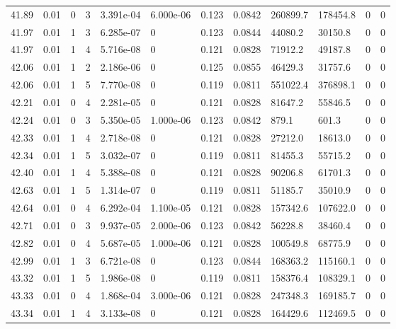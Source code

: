\documentclass[preview]{standalone}
\begin{document}
{{{{{{{{{{{{\begin{tabular}{L{1.2cm}C{1.2cm} C{0.3cm}C{0.5cm} C{1.4cm}C{1.4cm} C{1.4cm}C{1.4cm} C{1.6cm}C{1.6cm} C{1.6cm}C{1.6cm}}
  41.89  &  0.01  & 0     &  3 &  3.391e-04  & 6.000e-06  &  0.123&   0.0842& 260899.7 & 178454.8   &  0 & 0  \\ 
  41.97  &  0.01  & 1     &  3 &  6.285e-07  & 0  &  0.123&   0.0844& 44080.2 & 30150.8   &  0 & 0  \\ 
  41.97  &  0.01  & 1     &  4 &  5.716e-08  & 0  &  0.121&   0.0828& 71912.2 & 49187.8   &  0 & 0  \\ 
  42.06  &  0.01  & 1     &  2 &  2.186e-06  & 0  &  0.125&   0.0855& 46429.3 & 31757.6   &  0 & 0  \\ 
  42.06  &  0.01  & 1     &  5 &  7.770e-08  & 0  &  0.119&   0.0811& 551022.4 & 376898.1   &  0 & 0  \\ 
  42.21  &  0.01  & 0     &  4 &  2.281e-05  & 0  &  0.121&   0.0828& 81647.2 & 55846.5   &  0 & 0  \\ 
  42.24  &  0.01  & 0     &  3 &  5.350e-05  & 1.000e-06  &  0.123&   0.0842& 879.1 & 601.3   &  0 & 0  \\ 
  42.33  &  0.01  & 1     &  4 &  2.718e-08  & 0  &  0.121&   0.0828& 27212.0 & 18613.0   &  0 & 0  \\ 
  42.34  &  0.01  & 1     &  5 &  3.032e-07  & 0  &  0.119&   0.0811& 81455.3 & 55715.2   &  0 & 0  \\ 
  42.40  &  0.01  & 1     &  4 &  5.388e-08  & 0  &  0.121&   0.0828& 90206.8 & 61701.3   &  0 & 0  \\ 
  42.63  &  0.01  & 1     &  5 &  1.314e-07  & 0  &  0.119&   0.0811& 51185.7 & 35010.9   &  0 & 0  \\ 
  42.64  &  0.01  & 0     &  4 &  6.292e-04  & 1.100e-05  &  0.121&   0.0828& 157342.6 & 107622.0   &  0 & 0  \\ 
  42.71  &  0.01  & 0     &  3 &  9.937e-05  & 2.000e-06  &  0.123&   0.0842& 56228.8 & 38460.4   &  0 & 0  \\ 
  42.82  &  0.01  & 0     &  4 &  5.687e-05  & 1.000e-06  &  0.121&   0.0828& 100549.8 & 68775.9   &  0 & 0  \\ 
  42.99  &  0.01  & 1     &  3 &  6.721e-08  & 0  &  0.123&   0.0844& 168363.2 & 115160.1   &  0 & 0  \\ 
  43.32  &  0.01  & 1     &  5 &  1.986e-08  & 0  &  0.119&   0.0811& 158376.4 & 108329.1   &  0 & 0  \\ 
  43.33  &  0.01  & 0     &  4 &  1.868e-04  & 3.000e-06  &  0.121&   0.0828& 247348.3 & 169185.7   &  0 & 0  \\ 
  43.34  &  0.01  & 1     &  4 &  3.133e-08  & 0  &  0.121&   0.0828& 164429.6 & 112469.5   &  0 & 0  \\ 

\end{tabular}}}}}}}}}}}}}
\end{document}
